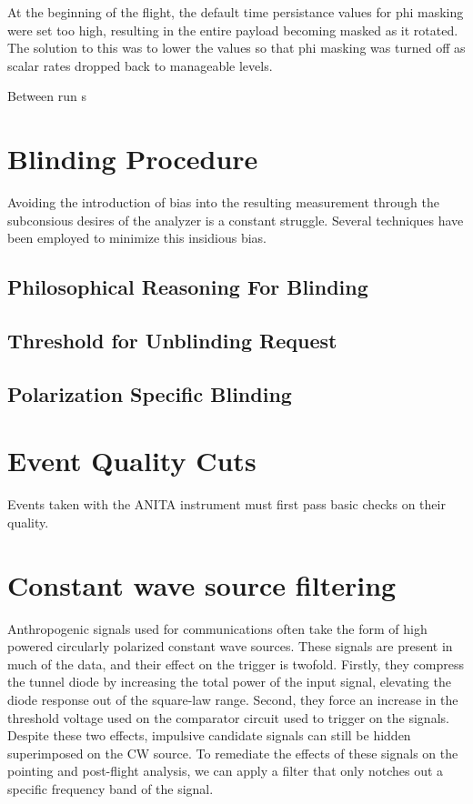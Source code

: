 		At the beginning of the flight, the default time persistance values for phi masking were set too high, resulting in the entire payload becoming masked as it rotated.  The solution to this was to lower the values so that phi masking was turned off as scalar rates dropped back to manageable levels.
		
		Between run s
	
\section{Blinding Procedure}
	Avoiding the introduction of bias into the resulting measurement through the subconsious desires of the analyzer is a constant struggle.  Several techniques have been employed to minimize this insidious bias.
	
	\subsection{Philosophical Reasoning For Blinding}
		
	\subsection{Threshold for Unblinding Request}
		
	\subsection{Polarization Specific Blinding}

\section{Event Quality Cuts}
	Events taken with the ANITA instrument must first pass basic checks on their quality.  


\section{Constant wave source filtering}
	Anthropogenic signals used for communications often take the form of high powered circularly polarized constant wave sources.  These signals are present in much of the data, and their effect on the trigger is twofold.  Firstly, they compress the tunnel diode by increasing the total power of the input signal, elevating the diode response out of the square-law range.  Second, they force an increase in the threshold voltage used on the comparator circuit used to trigger on the signals.  Despite these two effects, impulsive candidate signals can still be hidden superimposed on the CW source.  To remediate the effects of these signals on the pointing and post-flight analysis, we can apply a filter that only notches out a specific frequency band of the signal.
